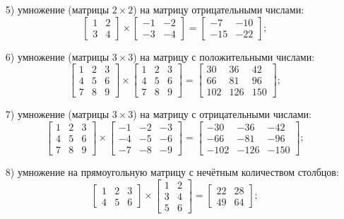 \documentclass[a4paper,14pt]{article}
\begin{document}
\begin{enumerate}
		\item[5)] умножение (матрицы $2 \times 2$) на матрицу отрицательными числами:
\[ \begin{bmatrix}
1 & 2 \\
3 & 4
\end{bmatrix} \times 
\begin{bmatrix}
-1 & -2 \\
-3 & -4
\end{bmatrix} =
\begin{bmatrix}
-7 & -10 \\
-15 & -22
\end{bmatrix}; \]


		\item[6)] умножение (матрицы $3 \times 3$) на матрицу с положительными числами:
\[ \begin{bmatrix}
1 & 2 & 3 \\
4 & 5 & 6 \\
7 & 8 & 9 
\end{bmatrix} \times 
\begin{bmatrix}
1 & 2 & 3 \\
4 & 5 & 6 \\
7 & 8 & 9 
\end{bmatrix} =
\begin{bmatrix}
30 & 36 & 42 \\
66 & 81 & 96 \\
102 & 126 & 150 
\end{bmatrix}; \]

		\item[7)] умножение (матрицы $3 \times 3$) на матрицу с отрицательными числами:
\[ \begin{bmatrix}
1 & 2 & 3 \\
4 & 5 & 6 \\
7 & 8 & 9 
\end{bmatrix} \times 
\begin{bmatrix}
-1 & -2 & -3 \\
-4 & -5 & -6 \\
-7 & -8 & -9 
\end{bmatrix} =
\begin{bmatrix}
-30 & -36 & -42 \\
-66 & -81 & -96 \\
-102 & -126 & -150 
\end{bmatrix}; \]

	\item[8)] умножение на прямоугольную матрицу с нечётным количеством столбцов:
\[ \begin{bmatrix}
1 & 2 & 3\\
4 & 5 & 6
\end{bmatrix} \times 
\begin{bmatrix}
1 & 2 \\
3 & 4 \\
5 & 6
\end{bmatrix} =
\begin{bmatrix}
22 & 28 \\
49 & 64
\end{bmatrix}; \]


\end{enumerate}
\end{document}
